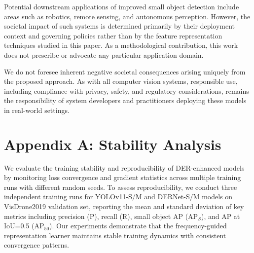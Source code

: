 \documentclass{article}
\theoremstyle{plain}
\theoremstyle{definition}
\theoremstyle{remark}
\begin{document}
Potential downstream applications of improved small object detection include areas such as robotics, remote sensing, and autonomous perception. However, the societal impact of such systems is determined primarily by their deployment context and governing policies rather than by the feature representation techniques studied in this paper. As a methodological contribution, this work does not prescribe or advocate any particular application domain.

We do not foresee inherent negative societal consequences arising uniquely from the proposed approach. As with all computer vision systems, responsible use, including compliance with privacy, safety, and regulatory considerations, remains the responsibility of system developers and practitioners deploying these models in real-world settings.

\clearpage
\twocolumn
\newpage



\newpage
\appendix
\onecolumn

\section{Appendix A: Stability Analysis}
\label{sec:appendix_a_stability}

We evaluate the training stability and reproducibility of DER-enhanced models by monitoring loss convergence and gradient statistics across multiple training runs with different random seeds. To assess reproducibility, we conduct three independent training runs for YOLOv11-S/M and DERNet-S/M models on VisDrone2019 validation set, reporting the mean and standard deviation of key metrics including precision (P), recall (R), small object AP (AP$_S$), and AP at IoU=0.5 (AP$_{50}$). Our experiments demonstrate that the frequency-guided representation learner maintains stable training dynamics with consistent convergence patterns.
\end{document}
